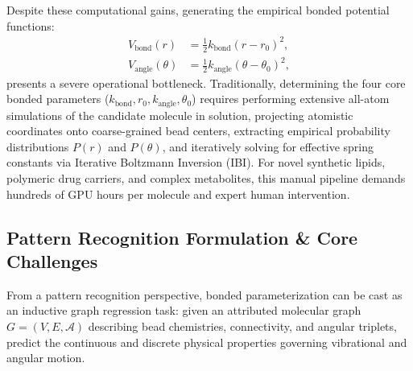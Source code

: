 \documentclass[10pt,journal,compsoc]{IEEEtran}
\begin{document}
Despite these computational gains, generating the empirical bonded potential functions:
\begin{align}
V_{\text{bond}}(r) &= \frac{1}{2} k_{\text{bond}} (r - r_0)^2, \label{eq:vbond}\\
V_{\text{angle}}(\theta) &= \frac{1}{2} k_{\text{angle}} (\theta - \theta_0)^2, \label{eq:vangle}
\end{align}
presents a severe operational bottleneck. Traditionally, determining the four core bonded parameters ($k_{\text{bond}}, r_0, k_{\text{angle}}, \theta_0$) requires performing extensive all-atom simulations of the candidate molecule in solution, projecting atomistic coordinates onto coarse-grained bead centers, extracting empirical probability distributions $P(r)$ and $P(\theta)$, and iteratively solving for effective spring constants via Iterative Boltzmann Inversion (IBI). For novel synthetic lipids, polymeric drug carriers, and complex metabolites, this manual pipeline demands hundreds of GPU hours per molecule and expert human intervention.

\subsection{Pattern Recognition Formulation \& Core Challenges}
From a pattern recognition perspective, bonded parameterization can be cast as an inductive graph regression task: given an attributed molecular graph $G = (V, E, \mathcal{A})$ describing bead chemistries, connectivity, and angular triplets, predict the continuous and discrete physical properties governing vibrational and angular motion.
\end{document}
